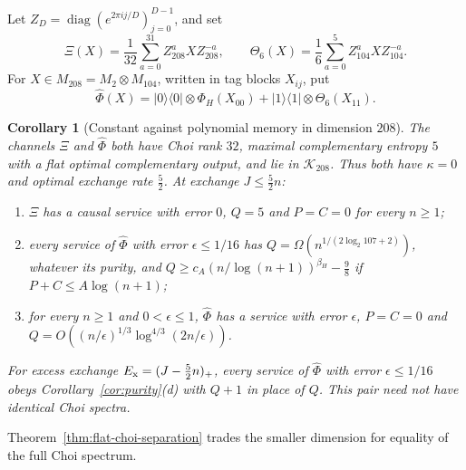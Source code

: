 \documentclass[11pt,a4paper]{article}
\theoremstyle{plain}
\newtheorem{corollary}[theorem]{Corollary}
\theoremstyle{definition}
\theoremstyle{remark}
\DeclareMathOperator{\diag}{diag}
\begin{document}
Let $Z_D=\diag(e^{2\pi ij/D})_{j=0}^{D-1}$, and set
\[
\Xi(X)=\frac1{32}\sum_{a=0}^{31}Z_{208}^aXZ_{208}^{-a},\qquad
\Theta_6(X)=\frac16\sum_{a=0}^5Z_{104}^aXZ_{104}^{-a}.
\]
For $X\in M_{208}=M_2\otimes M_{104}$, written in tag blocks $X_{ij}$, put
\[
\widehat\Phi(X)=|0\rangle\langle0|\otimes\Phi_H(X_{00})+|1\rangle\langle1|\otimes\Theta_6(X_{11}).
\]

\begin{corollary}[Constant against polynomial memory in dimension $208$]\label{cor:208}
The channels $\Xi$ and $\widehat\Phi$ both have Choi rank $32$, maximal complementary entropy $5$ with a flat optimal complementary output,
and lie in $\mathcal K_{208}$. Thus both have $\kappa=0$ and optimal exchange rate $\frac52$. At exchange $J\le\frac52n$:
\begin{enumerate}[label=(\alph*)]
\item $\Xi$ has a causal service with error $0$, $Q=5$ and $P=C=0$ for every $n\ge1$;
\item every service of $\widehat\Phi$ with error $\epsilon\le1/16$ has $Q=\Omega(n^{1/(2\log_2 107+2)})$, whatever its purity, and
$Q\ge c_A(n/\log(n+1))^{\beta_H}-\frac98$ if $P+C\le A\log(n+1)$;
\item for every $n\ge1$ and $0<\epsilon\le1$, $\widehat\Phi$ has a service with error $\epsilon$, $P=C=0$ and
$Q=O((n/\epsilon)^{1/3}\log^{4/3}(2n/\epsilon))$.
\end{enumerate}
For excess exchange $E_{\rm x}=(J-\frac52n)_+$, every service of $\widehat\Phi$ with error $\epsilon\le1/16$ obeys
Corollary~\ref{cor:purity}(d) with $Q+1$ in place of $Q$. This pair need not have identical Choi spectra.
\end{corollary}

Theorem~\ref{thm:flat-choi-separation} trades the smaller dimension for equality of the full Choi spectrum.
\end{document}

